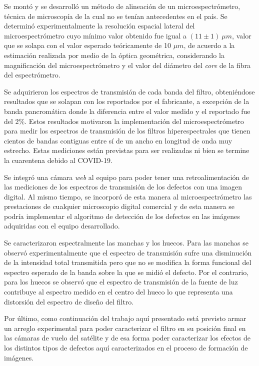 Se montó y se desarrolló un método de alineación de un microespectrómetro, técnica de microscopía de la cual no se tenían antecedentes en el país. Se determinó experimentalmente la resolución espacial lateral del microespectrómetro cuyo mínimo valor obtenido fue igual a $(11 \pm 1)~\mu m$, valor que se solapa con el valor esperado teóricamente de 10 $\mu m$, de acuerdo a la estimación realizada por medio de la óptica geométrica, considerando la magnificación del microespectrómetro y el valor del diámetro del \textit{core} de la fibra del espectrómetro.

Se adquirieron los espectros de transmisión de cada banda del filtro, obteniéndose resultados que se solapan con los reportados por el fabricante, a excepción de la banda pancromática donde la diferencia entre el valor medido y el reportado fue del 2\%. Estos resultados motivaron la implementación del microespectrómetro para medir los espectros de transmisión de los filtros hiperespectrales que tienen cientos de bandas contiguas entre sí de un ancho en longitud de onda muy estrecho. Estas mediciones están previstas para ser realizadas ni bien se termine la cuarentena debido al COVID-19.

Se integró una cámara \textit{web} al equipo para poder tener una retroalimentación de las mediciones de los espectros de transmisión de los defectos con una imagen digital. Al mismo tiempo, se incorporó de esta manera al microespectrómetro las prestaciones de cualquier microscopio digital comercial y de esta manera se podría implementar el algoritmo de detección de los defectos en las imágenes adquiridas con el equipo desarrollado.

Se caracterizaron espectralmente las manchas y los huecos. Para las manchas se observó experimentalmente que el espectro de transmisión sufre una disminución de la intensidad total transmitida pero que no se modifica la forma funcional del espectro esperado de la banda sobre la que se midió el defecto. Por el contrario, para los huecos se observó que el espectro de transmisión de la fuente de luz contribuye al espectro medido en el centro del hueco lo que representa una distorsión del espectro de diseño del filtro.

Por último, como continuación del trabajo aquí presentado está previsto armar un arreglo experimental para poder caracterizar el filtro en su posición final en las cámaras de vuelo del satélite y de esa forma poder caracterizar los efectos de los distintos tipos de defectos aquí caracterizados en el proceso de formación de imágenes.